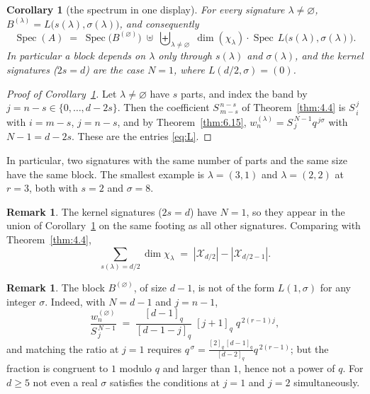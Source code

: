 \documentclass[11pt]{article}
\numberwithin{equation}{section}
\theoremstyle{plain}
\newtheorem{corollary}[theorem]{Corollary}
\theoremstyle{definition}
\newtheorem{remark}[theorem]{Remark}
\begin{document}
\begin{corollary}[the spectrum in one display]\label{thm:6.18}
For every signature
$\lambda\neq\varnothing$, $B^{(\lambda)}=L\bigl(s(\lambda),\sigma(\lambda)\bigr)$, and
consequently
\[
\operatorname{Spec}(A)\;=\;\operatorname{Spec}\bigl(B^{(\varnothing)}\bigr)
\;\uplus\;\biguplus_{\lambda\neq\varnothing}\;\dim(\chi_\lambda)\cdot
\operatorname{Spec}\,L\bigl(s(\lambda),\sigma(\lambda)\bigr).
\]
In particular a block depends on $\lambda$ only through $s(\lambda)$ and
$\sigma(\lambda)$, and the kernel signatures ($2s=d$) are the case $N=1$, where
$L(d/2,\sigma)=(0)$.
\end{corollary}

\begin{proof}[Proof of Corollary~\ref{thm:6.18}]
Let $\lambda\ne\varnothing$ have $s$ parts,
and index the band by $j=n-s\in\{0,\dots,d-2s\}$. Then the coefficient
$S^{\,n-s}_{\,m-s}$ of Theorem~\ref{thm:4.4} is $S^{\,j}_{\,i}$ with $i=m-s$, $j=n-s$, and by
Theorem~\ref{thm:6.15}, $w^{(\lambda)}_n=S^{\,N-1}_{\,j}q^{\,j\sigma}$ with $N-1=d-2s$. These are
the entries \eqref{eq:L}.
\end{proof}

In particular, two signatures with the same number of parts and the same size have the
same block. The smallest example is $\lambda=(3,1)$ and $\lambda=(2,2)$ at $r=3$, both
with $s=2$ and $\sigma=8$.

\begin{remark}\label{thm:6.19}
The kernel signatures ($2s=d$) have $N=1$, so they appear in the
union of Corollary~\ref{thm:6.18} on the same footing as all other signatures. Comparing with
Theorem~\ref{thm:4.4},
\[
\sum_{s(\lambda)=d/2}\dim\chi_\lambda\;=\;|\mathcal{X}_{d/2}|-|\mathcal{X}_{d/2-1}| .
\]
\end{remark}

\begin{remark}\label{thm:6.20}
The block $B^{(\varnothing)}$, of size $d-1$, is not of the form $L(1,\sigma)$
for any integer $\sigma$. Indeed, with $N=d-1$ and $j=n-1$,
\[
\frac{w^{(\varnothing)}_n}{S^{\,N-1}_{\,j}}
\;=\;\frac{[d-1]_q}{[d-1-j]_q}\;[j+1]_q\;q^{\,2(r-1)j},
\]
and matching the ratio at $j=1$ requires
$q^{\,\sigma}=\frac{[2]_q\,[d-1]_q}{[d-2]_q}q^{\,2(r-1)}$; but the fraction is congruent to
$1$ modulo $q$ and larger than $1$, hence not a power of $q$. For $d\ge5$ not even a
real $\sigma$ satisfies the conditions at $j=1$ and $j=2$ simultaneously.
\end{remark}
\end{document}
